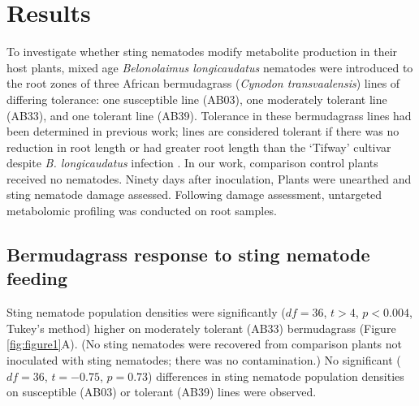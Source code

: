 \documentclass[fleqn,10pt]{wlscirep}
\begin{document}
\section*{Results}

To investigate whether sting nematodes modify metabolite production in their host plants, mixed age \textit{Belonolaimus longicaudatus} nematodes were introduced to the root zones of three African bermudagrass (\textit{Cynodon transvaalensis}) lines of differing tolerance: one susceptible line (AB03), one moderately tolerant line (AB33), and one tolerant line (AB39).  Tolerance in these bermudagrass lines had been determined in previous work; lines are considered tolerant if there was no reduction in root length or had greater root length than the ‘Tifway’ cultivar despite \textit{B. longicaudatus} infection \cite{pang2011bermudagrass, pang2011screening}.  In our work, comparison control plants received no nematodes.  Ninety days after inoculation,  Plants were unearthed and sting nematode damage assessed.  Following damage assessment, untargeted metabolomic profiling was conducted on root samples.  

\subsection*{Bermudagrass response to sting nematode feeding}
Sting nematode population densities were significantly ($df = 36$, $t > 4$, $p < 0.004$, Tukey's method) higher on moderately tolerant (AB33) bermudagrass (Figure \ref{fig:figure1}A).  (No sting nematodes were recovered from comparison plants not inoculated with sting nematodes; there was no contamination.)  No significant ($df = 36$, $t = -0.75$, $p = 0.73$) differences in sting nematode population densities on susceptible (AB03) or tolerant (AB39) lines were observed.  
\end{document}
